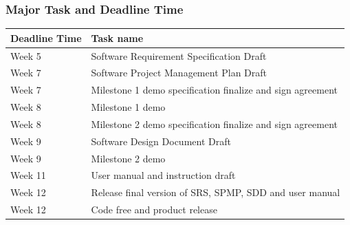 \subsubsection{Major Task and Deadline Time}
	\begin{tabular}{|p{3cm}|p{8cm}|}
		\hline 
		\textbf{Deadline Time} &\textbf{Task name} \\ 
		\hline 
			Week 5 & Software Requirement Specification Draft\\ 
		\hline 
			Week 7 & Software Project Management Plan Draft\\ 
		\hline 		
			Week 7 & Milestone 1 demo specification finalize and sign agreement\\ 
		\hline 
			Week 8 & Milestone 1 demo\\ 
		\hline 
			Week 8 & Milestone 2 demo specification finalize and sign agreement\\ 
		\hline 
			Week 9 & Software Design Document Draft\\ 
		\hline 
			Week 9 & Milestone 2 demo\\ 
		\hline 		
			Week 11 & User manual and instruction draft\\ 
		\hline 
			Week 12 & Release final version of SRS, SPMP, SDD and user manual\\ 
		\hline 
			Week 12 & Code free and product release\\ 
		\hline 
	\end{tabular} 

